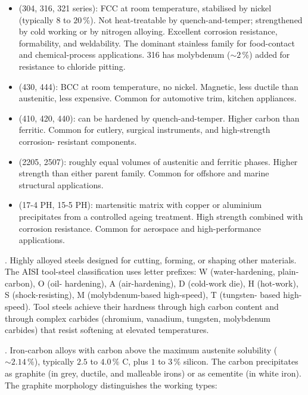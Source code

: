 \begin{itemize}[leftmargin=*]
\item {} (304, 316, 321 series): FCC at
  room temperature, stabilised by nickel (typically $8$ to $20\,\%$).
  Not heat-treatable by quench-and-temper; strengthened by cold
  working or by nitrogen alloying. Excellent corrosion resistance,
  formability, and weldability. The dominant stainless family for
  food-contact and chemical-process applications. 316 has molybdenum
  ($\sim 2\,\%$) added for resistance to chloride pitting.
\item {} (430, 444): BCC at room temperature,
  no nickel. Magnetic, less ductile than austenitic, less expensive.
  Common for automotive trim, kitchen appliances.
\item {} (410, 420, 440): can be hardened
  by quench-and-temper. Higher carbon than ferritic. Common for
  cutlery, surgical instruments, and high-strength corrosion-
  resistant components.
\item {} (2205, 2507): roughly equal volumes
  of austenitic and ferritic phases. Higher strength than either
  parent family. Common for offshore and marine structural
  applications.
\item {} (17-4 PH, 15-5 PH):
  martensitic matrix with copper or aluminium precipitates from a
  controlled ageing treatment. High strength combined with corrosion
  resistance. Common for aerospace and high-performance applications.
\end{itemize}

. Highly alloyed steels designed for cutting,
forming, or shaping other materials. The AISI tool-steel classification
uses letter prefixes: W (water-hardening, plain-carbon), O (oil-
hardening), A (air-hardening), D (cold-work die), H (hot-work),
S (shock-resisting), M (molybdenum-based high-speed), T (tungsten-
based high-speed). Tool steels achieve their hardness through high
carbon content and through complex carbides (chromium, vanadium,
tungsten, molybdenum carbides) that resist softening at elevated
temperatures.

. Iron-carbon alloys with carbon above the
maximum austenite solubility ($\sim 2.14\,\%$), typically $2.5$ to
$4.0\,\%$ C, plus $1$ to $3\,\%$ silicon. The carbon precipitates as
graphite (in grey, ductile, and malleable irons) or as cementite (in
white iron). The graphite morphology distinguishes the working types:

